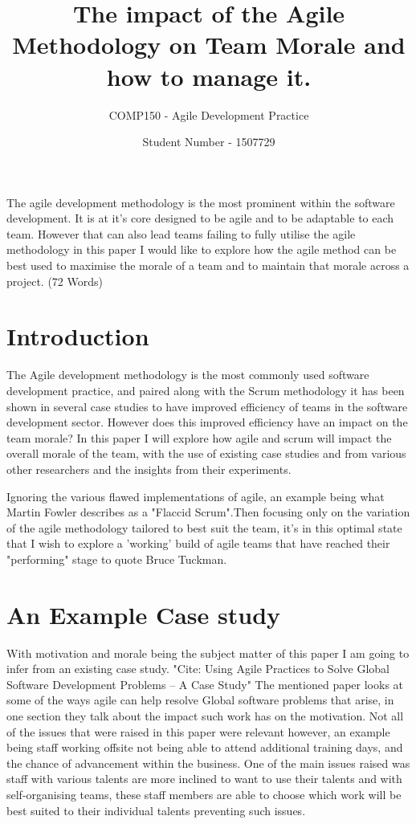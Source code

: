 \documentclass{scrartcl}
\title{The impact of the Agile Methodology on Team Morale and how to manage it.}
\subtitle{COMP150 - Agile Development Practice}
\author{Student Number - 1507729}
\begin{document}
\maketitle

\abstract The agile development methodology is the most prominent within the software development. It is at it's core designed to be agile and to be adaptable to each team. However that can also lead teams failing to fully utilise the agile methodology  in this paper I would like to explore how the agile method can be best used to maximise the morale of a team and to maintain that morale across a project. (72 Words)

\section{Introduction}

The Agile development methodology is the most commonly used software development practice, and paired along with the Scrum methodology it has been shown in several case studies to have improved efficiency of teams in the software development sector. However does this improved efficiency have an impact on the team morale? In this paper I will explore how agile and scrum will impact the overall morale of the team, with the use of existing case studies and from various other researchers and the insights from their experiments. 

Ignoring the various flawed implementations of agile, an example being what Martin Fowler describes as a "Flaccid Scrum".Then focusing only on the variation of the agile methodology tailored to best suit the team, it's in this optimal state that I wish to explore a 'working' build of agile teams that have reached their "performing" stage to quote Bruce Tuckman. 

\section{An Example Case study}

With motivation and morale being the subject matter of this paper I am going to infer from an existing case study. "Cite: Using Agile Practices to Solve Global Software Development Problems -- A Case Study" The mentioned paper looks at some of the ways agile can help resolve Global software problems that arise, in one section they talk about the impact such work has on the motivation. Not all of the issues that were raised in this paper were relevant however, an example being staff working offsite not being able to attend additional training days, and the chance of advancement within the business. One of the main issues raised was staff with various talents are more inclined to want to use their talents and with self-organising teams, these staff members are able to choose which work will be best suited to their individual talents preventing such issues.
\end{document}
